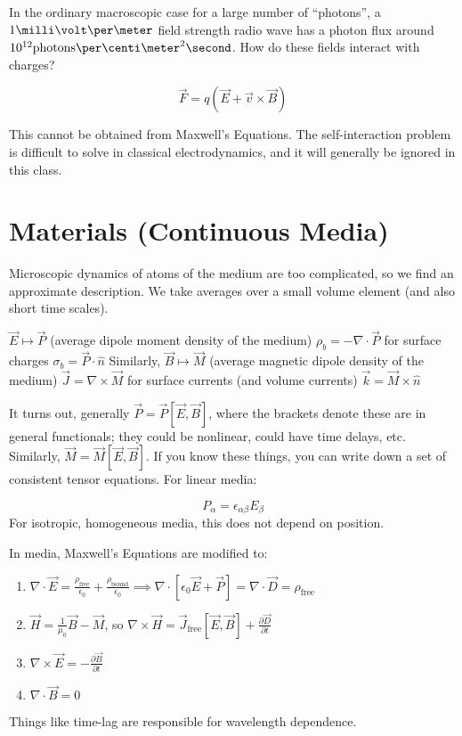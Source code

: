 \documentclass[twoside,master.tex]{subfiles}
\begin{document}
In the ordinary macroscopic case for a large number of ``photons'', a $1\milli\volt\per\meter$ field strength radio wave has a photon flux around $10^{12}\text{photons}\per\centi\meter^2\second$. How do these fields interact with charges?

\begin{equation}
    \vec{F} = q\left( \vec{E}+\vec{v}\times \vec{B} \right)
\end{equation}

This cannot be obtained from Maxwell's Equations. The self-interaction problem is difficult to solve in classical electrodynamics, and it will generally be ignored in this class.

\section{Materials (Continuous Media)}%
\label{sec:materials_c}

Microscopic dynamics of atoms of the medium are too complicated, so we find an approximate description. We take averages over a small volume element (and also short time scales).

$ \vec{E}\mapsto \vec{P}$ (average dipole moment density of the medium)
$\rho_b = -\nabla \cdot \vec{P}$ for surface charges $\sigma_b = \vec{P}\cdot \hat{n}$
Similarly,
$\vec{B}\mapsto \vec{M}$ (average magnetic dipole density of the medium)
$\vec{J}=\nabla \times \vec{M}$ for surface currents (and volume currents) $\vec{k}=\vec{M}\times \hat{n}$

It turns out, generally $\vec{P}=\vec{P}\left[ \vec{E},\vec{B} \right] $, where the brackets denote these are in general functionals; they could be nonlinear, could have time delays, etc. Similarly, $\vec{M}=\vec{M}\left[ \vec{E},\vec{B} \right] $. If you know these things, you can write down a set of consistent tensor equations. For linear media:

\begin{equation}
    P_\alpha = \epsilon_{\alpha\beta}E_\beta
\end{equation}
For isotropic, homogeneous media, this does not depend on position.

In media, Maxwell's Equations are modified to:
\begin{enumerate}
    \item  $\nabla \cdot \vec{E} = \frac{\rho_\text{free}}{\epsilon_0}+\frac{\rho_\text{bound}}{\epsilon_0}\implies\nabla \cdot \left[ \epsilon_0 \vec{E} + \vec{P} \right] = \nabla \cdot \vec{D} = \rho_\text{free} $
    \item $\vec{H} = \frac{1}{\mu_0} \vec{B} - \vec{M}$, so $ \nabla \times \vec{H} = \vec{J}_\text{free}\left[ \vec{E},\vec{B} \right]+ \frac{\partial \vec{D}}{\partial t} $
    \item $\nabla \times \vec{E} = - \frac{\partial \vec{B}}{\partial t}$
    \item $ \nabla \cdot \vec{B} = 0$
\end{enumerate}
Things like time-lag are responsible for wavelength dependence.
\end{document}
